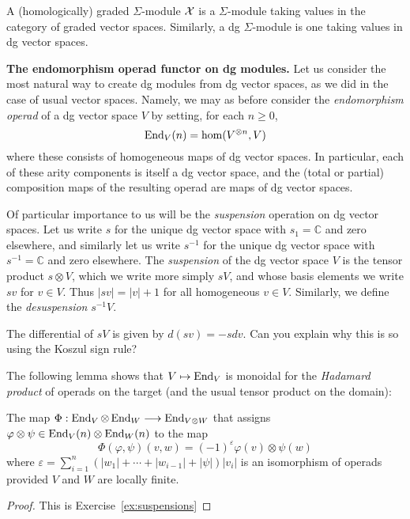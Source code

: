 \begin{definition}
A (homologically) graded $\Sigma$-module $\mathcal{X}$
is a $\Sigma$-module taking values in the category
of graded vector spaces. Similarly, a dg $\Sigma$-module
is one taking values in dg vector spaces.
\end{definition}

\textbf{The endomorphism operad functor on dg modules.}
Let us consider the most natural way to create dg modules
from dg vector spaces, as we did in the case of usual
vector spaces. Namely, we may as before consider the
\emph{endomorphism operad} of a dg vector space $V$
by setting, for each $n\geqslant 0$,
\[ \operatorname{End}_V(n) = \hom(V^{\otimes n},V) \]
where these consists of homogeneous maps of dg vector
spaces. In particular, each of these arity components is 
itself a dg vector space, and the (total or partial)
composition maps
of the resulting operad are maps of dg vector spaces.

Of particular importance to us will be the \emph{suspension}
operation on dg vector spaces. Let us write $s$ for the
unique dg vector space with $s_1 = \mathbb C$ and zero
elsewhere, and similarly let us write $s^{-1}$ for the
unique dg vector space with $s^{-1} = \mathbb{C}$
and zero elsewhere. The \emph{suspension} of the dg vector
space $V$ is the tensor product $s\otimes V$, which
we write more simply $sV$, and whose basis elements we
write $sv$ for $v\in V$. Thus $|sv| = |v|+1$ for all 
homogeneous $v\in V$. Similarly, we define the
\emph{desuspension} $s^{-1}V$.

\begin{note}
The differential of $sV$ is given by $d(sv) = -s dv$. Can you explain why this is so using
the Koszul sign rule?
\end{note}
 
The following lemma shows that $V\mapsto \operatorname{End}_V$ is 
monoidal for the \emph{Hadamard product} of operads on the
target (and the usual tensor product on the domain): 
 \begin{lemma}\label{lemma:hadamard}
The map $\Phi : \operatorname{End}_V\otimes \operatorname{End}_W\longrightarrow \operatorname{End}_{V\otimes W}$
that assigns $\varphi \otimes \psi \in \operatorname{End}_V(n)\otimes \operatorname{End}_W(n)$
to the map
\[ \Phi(\varphi,\psi)(v,w) = (-1)^\varepsilon \varphi(v)\otimes\psi(w)\]
where $\varepsilon = \sum_{i=1}^n (|w_1| +\cdots + |w_{i-1}|+|\psi|)|v_i|$
is an isomorphism of operads provided $V$ and $W$
are locally finite.
 \end{lemma}
 
 \begin{proof}
 This is Exercise~\ref{ex:suspensions}
 \end{proof}

